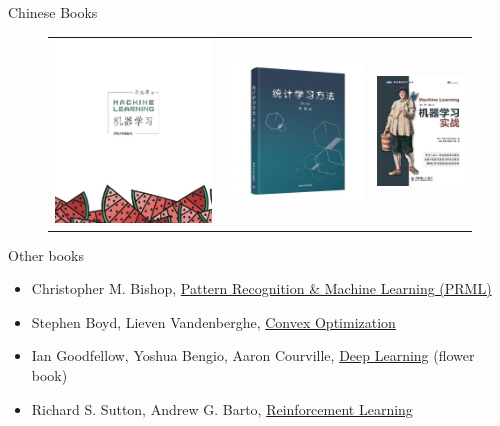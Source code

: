 \documentclass{../TexTemplate/myslide}
\begin{document}
\begin{frame}{Chinese Books}
\begin{figure}
\centering
\begin{tabular}{ccc}
\href{https://book.douban.com/subject/26708119/}{\includegraphics[width=0.3\linewidth]{fig/watermelon_book.jpg}} &
\href{https://item.jd.com/47384022706.html}{\includegraphics[width=0.32\linewidth]{fig/statistical_ml.jpg}}&
\href{https://book.douban.com/subject/24703171/}{\includegraphics[width=0.25\linewidth]{fig/ml_in_action.jpg}}
\end{tabular}
\end{figure}
\end{frame}

\begin{frame}{Other books}
\begin{itemize}
	\item Christopher M. Bishop, \href{http://users.isr.ist.utl.pt/~wurmd/Livros/school/Bishop\%20-\%20Pattern\%20Recognition\%20And\%20Machine\%20Learning\%20-\%20Springer\%20\%202006.pdf}{Pattern Recognition \& Machine Learning (PRML)}
	\item Stephen Boyd, Lieven Vandenberghe, \href{https://web.stanford.edu/~boyd/cvxbook/bv_cvxbook.pdf}{Convex Optimization}
	\item Ian Goodfellow, Yoshua Bengio, Aaron Courville, \href{https://www.deeplearningbook.org/}{Deep Learning} (flower book)
	\item Richard S. Sutton, Andrew G. Barto, \href{https://web.stanford.edu/class/psych209/Readings/SuttonBartoIPRLBook2ndEd.pdf}{Reinforcement Learning}
\end{itemize}
\end{frame}
\end{document}
